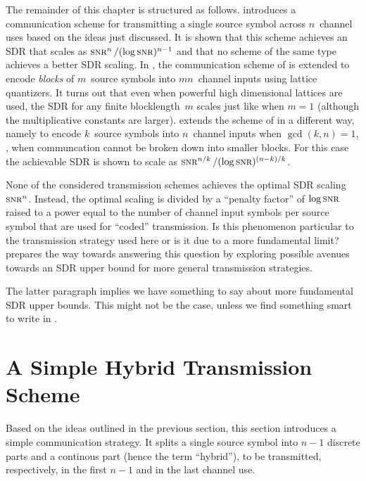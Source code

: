 The remainder of this chapter is structured as follows. 
introduces a communication scheme for transmitting a single source symbol across
$n$~channel uses based on the ideas just discussed. It is shown that this scheme
achieves an SDR that scales as $\snr^n / (\log\snr)^{n-1}$ and that no scheme of
the same type achieves a better SDR scaling. In , the
communication scheme of  is extended to encode \emph{blocks}
of $m$~source symbols into $mn$~channel inputs using lattice quantizers.  It
turns out that even when powerful high dimensional lattices are used, the SDR
for any finite blocklength~$m$ scales just like when $m = 1$ (although the
multiplicative constants are larger).  extends the scheme of
 in a different way, namely to encode $k$~source symbols
into $n$~channel inputs when $\gcd(k,n) = 1$, \ie, when communcation cannot be
broken down into smaller blocks. For this case the achievable SDR is shown to
scale as $\snr^{n/k}/(\log\snr)^{(n-k)/k}$. 

None of the considered transmission schemes achieves the optimal SDR
scaling~$\snr^n$. Instead, the optimal scaling is divided by a ``penalty
factor'' of $\log\snr$ raised to a power equal to the number of channel input
symbols per source symbol that are used for ``coded'' transmission. Is this
phenomenon particular to the transmission strategy used here or is it due to a
more fundamental limit?  prepares the way towards answering
this question by exploring possible avenues towards an SDR upper bound for more
general transmission strategies. 

\begin{notebox}
  The latter paragraph implies we have something to say about more fundamental
  SDR upper bounds. This might not be the case, unless we find something smart
  to write in .
\end{notebox}



\section{A Simple Hybrid Transmission Scheme}\label{sec:scalarquant}

Based on the ideas outlined in the previous section, this section
introduces a simple communication strategy. It splits a single source symbol
into $n-1$ discrete parts and a continous part (hence the term ``hybrid''), to
be transmitted, respectively, in the first $n-1$ and in the last channel use. 


